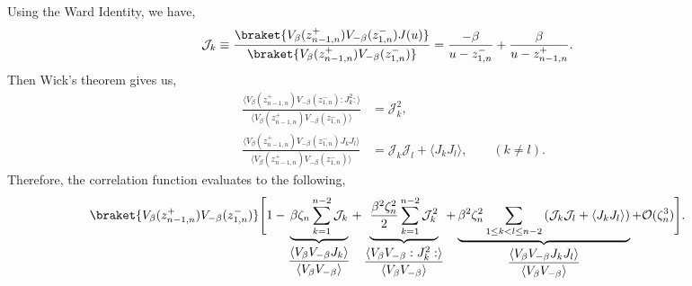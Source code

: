 \documentclass[11pt]{article}
\begin{document}
Using the Ward Identity\cite{yellowbook}, we have,
\begin{align}\label{eq: normalized Ward Identity}
    \mathcal J_k \equiv  \frac{\braket{V_\beta(z_{n-1,n}^+)V_{-\beta}(z_{1,n}^-)J(u)}}{\braket{V_\beta(z_{n-1,n}^+)V_{-\beta}(z_{1,n}^-)}} &= \frac{-\beta }{u-z_{1,n}^-} + \frac{\beta}{u-z_{n-1,n}^+}.
\end{align}
Then Wick's theorem \cite{yellowbook} gives us,
\begin{align}
\frac{\langle V_\beta(z_{n-1,n}^{+})
V_{-\beta}(z_{1,n}^{-}):J_k^2:\rangle}{\langle V_\beta(z_{n-1,n}^{+})
V_{-\beta}(z_{1,n}^{-})\rangle}
&=
\mathcal J_k^2,
\\
\frac{\langle V_\beta(z_{n-1,n}^{+})
V_{-\beta}(z_{1,n}^{-})J_kJ_l\rangle}{\langle V_\beta(z_{n-1,n}^{+})
V_{-\beta}(z_{1,n}^{-})\rangle}
&=
\mathcal J_k\mathcal J_l
+\langle J_kJ_l\rangle,
\qquad (k\neq l).
\end{align}
Therefore, the correlation function evaluates to the following,
\begin{align}
&
\braket{V_\beta(z_{n-1,n}^+)V_{-\beta}(z_{1,n}^-)}\Bigg[ 1
%
-\underbrace{
\beta\zeta_n
\sum_{k=1}^{n-2}\mathcal J_k
}_{\displaystyle
\frac{\langle V_\beta V_{-\beta}J_k\rangle}
{\langle V_\beta V_{-\beta}\rangle}
}
\nonumber
+\underbrace{
\frac{\beta^2\zeta_n^2}{2}
\sum_{k=1}^{n-2}\mathcal J_k^2
}_{\displaystyle
\frac{\langle V_\beta V_{-\beta}:J_k^2:\rangle}
{\langle V_\beta V_{-\beta}\rangle}
}
+\underbrace{
\beta^2\zeta_n^2
\sum_{1\leq k<l\leq n-2}
\left(
\mathcal J_k\mathcal J_l
+\langle J_kJ_l\rangle
\right)
}_{\displaystyle
\frac{\langle V_\beta V_{-\beta}J_kJ_l\rangle}
{\langle V_\beta V_{-\beta}\rangle}
}
+\mathcal O(\zeta_n^3)\Bigg].
\label{eq:Fn_after_wick}
\end{align}
\end{document}
